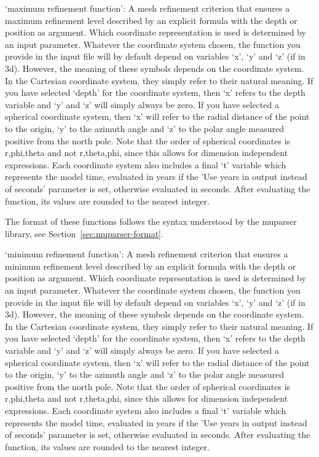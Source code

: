 \begin{itemize}
`maximum refinement function': A mesh refinement criterion that ensures a maximum refinement level described by an explicit formula with the depth or position as argument. Which coordinate representation is used is determined by an input parameter. Whatever the coordinate system chosen, the function you provide in the input file will by default depend on variables `x', `y' and `z' (if in 3d). However, the meaning of these symbols depends on the coordinate system. In the Cartesian coordinate system, they simply refer to their natural meaning. If you have selected `depth' for the coordinate system, then `x' refers to the depth variable and `y' and `z' will simply always be zero. If you have selected a spherical coordinate system, then `x' will refer to the radial distance of the point to the origin, `y' to the azimuth angle and `z' to the polar angle measured positive from the north pole. Note that the order of spherical coordinates is r,phi,theta and not r,theta,phi, since this allows for dimension independent expressions. Each coordinate system also includes a final `t' variable which represents the model time, evaluated in years if the 'Use years in output instead of seconds' parameter is set, otherwise evaluated in seconds. After evaluating the function, its values are rounded to the nearest integer.

The format of these functions follows the syntax understood by the muparser library, see Section~\ref{sec:muparser-format}.

`minimum refinement function': A mesh refinement criterion that ensures a minimum refinement level described by an explicit formula with the depth or position as argument. Which coordinate representation is used is determined by an input parameter. Whatever the coordinate system chosen, the function you provide in the input file will by default depend on variables `x', `y' and `z' (if in 3d). However, the meaning of these symbols depends on the coordinate system. In the Cartesian coordinate system, they simply refer to their natural meaning. If you have selected `depth' for the coordinate system, then `x' refers to the depth variable and `y' and `z' will simply always be zero. If you have selected a spherical coordinate system, then `x' will refer to the radial distance of the point to the origin, `y' to the azimuth angle and `z' to the polar angle measured positive from the north pole. Note that the order of spherical coordinates is r,phi,theta and not r,theta,phi, since this allows for dimension independent expressions. Each coordinate system also includes a final `t' variable which represents the model time, evaluated in years if the 'Use years in output instead of seconds' parameter is set, otherwise evaluated in seconds. After evaluating the function, its values are rounded to the nearest integer.


\end{itemize}
